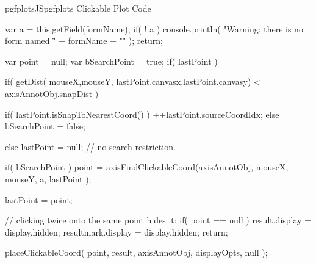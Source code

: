 {{\begin{insDLJS}[processAnnotatedPlot]{pgfplotsJS}{pgfplots Clickable Plot Code}
{	var a = this.getField(formName);
	if( ! a ) {
		console.println( "Warning: there is no form named \"" + formName + "\"" );
		return;
	}

	var point = null;
	var bSearchPoint = true;
	if( lastPoint ) {
		if( getDist( mouseX,mouseY,  lastPoint.canvasx,lastPoint.canvasy) < axisAnnotObj.snapDist ) {
			if( lastPoint.isSnapToNearestCoord() )
				++lastPoint.sourceCoordIdx;
			else
				bSearchPoint = false;

		} else
			lastPoint = null; // no search restriction.
	}
	if( bSearchPoint )
		point = axisFindClickableCoord(axisAnnotObj, mouseX, mouseY, a, lastPoint ); 

	lastPoint = point;

	// clicking twice onto the same point hides it:
	if( point == null ) {
		result.display = display.hidden;
		resultmark.display = display.hidden;
		return;
	}

	placeClickableCoord( 
		point,
		result, axisAnnotObj, displayOpts, null );
}

\end{insDLJS}

%
%
\def\pgfplots@clickable@xypat@error{\pgfplots@error{Sorry, \string\pgfplotsset{annot/xy pattern/.initial=...} can only be assigned *before* \string\usepgfplotslibrary{clickable}}}%
%
%
\def\pgfplots@clickable@nosuchcoord@error{\pgfplots@error{Sorry, \string\pgfplotsset{annot/no such coord/.initial=...} can only be assigned *before* \string\usepgfplotslibrary{clickable}}}%

\def\pgfplots@clickable@beginaxis{%
	\pgfplotsapplistXglobalnewempty\pgfplots@clickable@collectedplots
	\gdef\pgfplots@clickable@collectedplots@isempty{1}%
}%

}}
